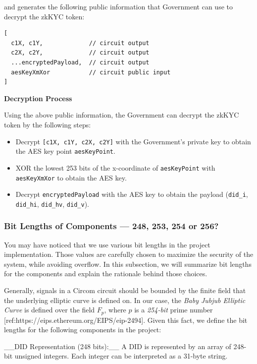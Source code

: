 \documentclass[
]{report}
\providecommand{\tightlist}{%
  \setlength{\itemsep}{0pt}\setlength{\parskip}{0pt}}
\begin{document}
and generates the following public information that Government can use
to decrypt the zkKYC token:

\begin{verbatim}
[
  c1X, c1Y,             // circuit output
  c2X, c2Y,             // circuit output
  ...encryptedPayload,  // circuit output
  aesKeyXmXor           // circuit public input
]
\end{verbatim}

\textbf{Decryption Process}

Using the above public information, the Government can decrypt the zkKYC
token by the following steps:

\begin{itemize}
\tightlist
\item
  Decrypt \texttt{{[}c1X,\ c1Y,\ c2X,\ c2Y{]}} with the Government's
  private key to obtain the AES key point \texttt{aesKeyPoint}.
\item
  XOR the lowest 253 bits of the x-coordinate of \texttt{aesKeyPoint}
  with \texttt{aesKeyXmXor} to obtain the AES key.
\item
  Decrypt \texttt{encryptedPayload} with the AES key to obtain the
  payload (\texttt{did\_i}, \texttt{did\_hi}, \texttt{did\_hv},
  \texttt{did\_v}).
\end{itemize}

\subsubsection{Bit Lengths of Components --- 248, 253, 254 or 256?}

You may have noticed that we use various bit lengths in the project
implementation. Those values are carefully chosen to maximize the
security of the system, while avoiding overflow. In this subsection, we
will summarize bit lengths for the components and explain the rationale
behind those choices.

Generally, signals in a Circom circuit should be bounded by the finite
field that the underlying elliptic curve is defined on. In our case, the
\emph{Baby Jubjub Elliptic Curve} is defined over the field \(F_p\),
where \(p\) is a \emph{254-bit} prime number
{[}ref:https://eips.ethereum.org/EIPS/eip-2494{]}. Given
this fact, we define the bit lengths for the following components in the
project:

\_\_DID Representation (248 bits):\_\_ A DID is represented by
an array of 248-bit unsigned integers. Each integer can be interpreted
as a 31-byte string.
\end{document}

